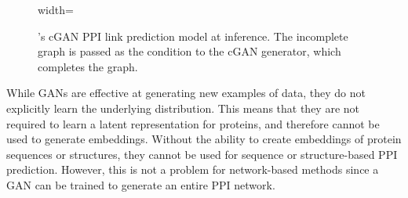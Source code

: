 \documentclass{article}
\begin{document}
\begin{figure}[htbp]
\begin{adjustbox}{width=\textwidth}
  \end{adjustbox}
  \caption{\citet{balogh_efficient_2022}'s cGAN PPI link prediction model at inference. The incomplete graph is passed as the condition to the cGAN generator, which completes the graph.}
  \label{fig:cgan_graph}
\end{figure}

While GANs are effective at generating new examples of data, they do not explicitly learn the underlying distribution. This means that they are not required to learn a latent representation for proteins, and therefore cannot be used to generate embeddings. Without the ability to create embeddings of protein sequences or structures, they cannot be used for sequence or structure-based PPI prediction. However, this is not a problem for network-based methods since a GAN can be trained to generate an entire PPI network.
\end{document}
